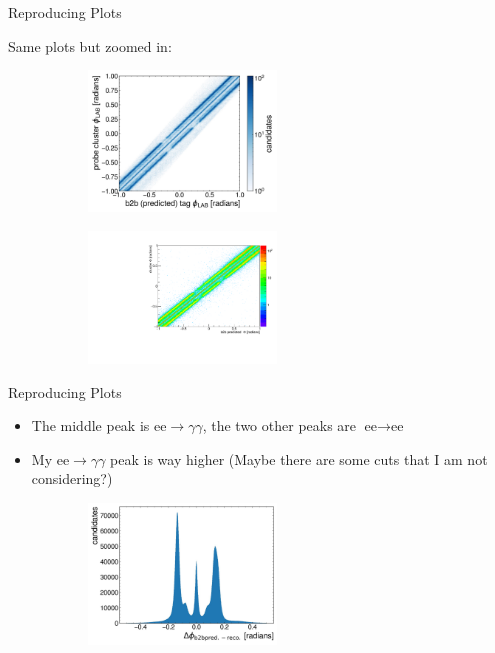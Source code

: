 \documentclass[10pt]{beamer}
\begin{document}
{\begin{frame}{Reproducing Plots}
	
	Same plots but zoomed in:
	
		\begin{figure}
		\centering
		\begin{subfigure}{.5\textwidth}
			\centering
			\includegraphics[width=5cm]{Plots/ZommedSam.jpeg}
			
			\label{fig:sub1}
		\end{subfigure}%
		\begin{subfigure}{.5\textwidth}
			\centering
			\includegraphics[width=5cm]{Plots/zommedb2b}
			
			\label{fig:sub2}
		\end{subfigure}
		
		\label{fig:test}
	\end{figure}
		
\end{frame}


\begin{frame}{Reproducing Plots}
\begin{itemize} 
	\item The middle peak is $\textrm{ee} \rightarrow \gamma \gamma$, the two other peaks are $\textrm{ee} \rightarrow \textrm{ee}$
	\item My $\textrm{ee} \rightarrow \gamma \gamma$ peak is way higher (Maybe there are some cuts that I am not considering?)

\end{itemize}
\begin{figure}
	\centering
	\begin{subfigure}{.5\textwidth}
		\centering
		\includegraphics[width=5cm]{Plots/deltaPhiSam.jpeg}
	

\end{subfigure}
\end{figure}
\end{frame}}
\end{document}
